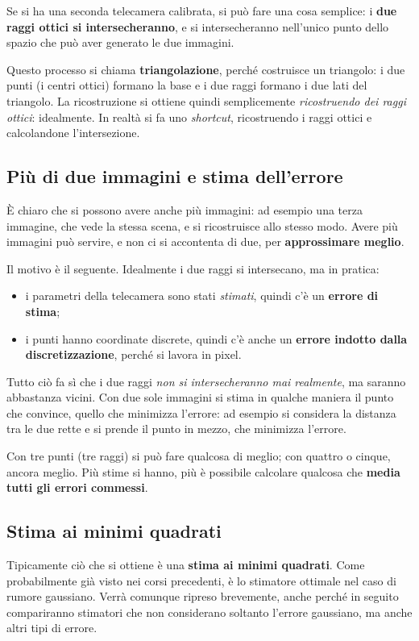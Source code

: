 Se si ha una seconda telecamera calibrata, si può fare una cosa semplice: i \textbf{due raggi ottici si intersecheranno}, e si intersecheranno nell'unico punto dello spazio che può aver generato le due immagini.

Questo processo si chiama \textbf{triangolazione}, perché costruisce un triangolo: i due punti (i centri ottici) formano la base e i due raggi formano i due lati del triangolo. La ricostruzione si ottiene quindi semplicemente \emph{ricostruendo dei raggi ottici}: idealmente. In realtà si fa uno \emph{shortcut}, ricostruendo i raggi ottici e calcolandone l'intersezione.

\subsection{Più di due immagini e stima dell'errore}

È chiaro che si possono avere anche più immagini: ad esempio una terza immagine, che vede la stessa scena, e si ricostruisce allo stesso modo. Avere più immagini può servire, e non ci si accontenta di due, per \textbf{approssimare meglio}.

Il motivo è il seguente. Idealmente i due raggi si intersecano, ma in pratica:
\begin{itemize}
  \item i parametri della telecamera sono stati \emph{stimati}, quindi c'è un \textbf{errore di stima};
  \item i punti hanno coordinate discrete, quindi c'è anche un \textbf{errore indotto dalla discretizzazione}, perché si lavora in pixel.
\end{itemize}
Tutto ciò fa sì che i due raggi \emph{non si intersecheranno mai realmente}, ma saranno abbastanza vicini. Con due sole immagini si stima in qualche maniera il punto che convince, quello che minimizza l'errore: ad esempio si considera la distanza tra le due rette e si prende il punto in mezzo, che minimizza l'errore.

Con tre punti (tre raggi) si può fare qualcosa di meglio; con quattro o cinque, ancora meglio. Più stime si hanno, più è possibile calcolare qualcosa che \textbf{media tutti gli errori commessi}.

\subsection{Stima ai minimi quadrati}

Tipicamente ciò che si ottiene è una \textbf{stima ai minimi quadrati}. Come probabilmente già visto nei corsi precedenti, è lo stimatore ottimale nel caso di rumore gaussiano. Verrà comunque ripreso brevemente, anche perché in seguito compariranno stimatori che non considerano soltanto l'errore gaussiano, ma anche altri tipi di errore.

